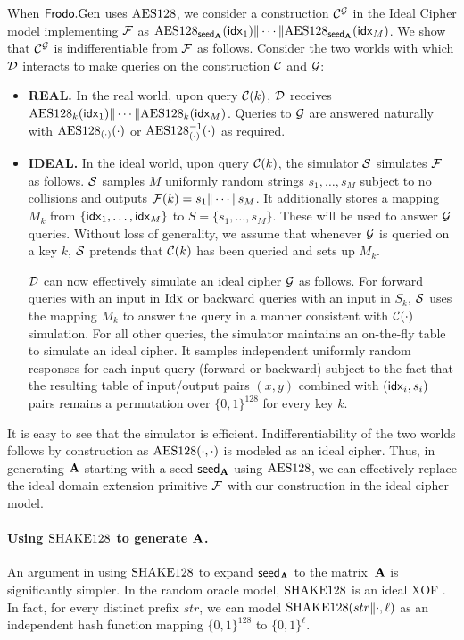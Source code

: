 \documentclass{iacrcc}
\begin{document}
When $\textsf{\upshape\mdseries Frodo}.\textrm{\upshape\mdseries Gen}$ uses $\textrm{\upshape\mdseries AES128}$, we consider a construction
$\mathcal{C}^{\mathcal{G}}$
in the Ideal Cipher model implementing $\mathcal{F}$ as $\textrm{\upshape\mdseries AES128}_{{\mathsf{seed}_{\mathbf{A}}}}(\mathsf{idx}_1) \| \cdots \| \textrm{\upshape\mdseries AES128}_{{\mathsf{seed}_{\mathbf{A}}}}(\mathsf{idx}_M)$. We show that
$\mathcal{C}^{\mathcal{G}}$ is indifferentiable from $\mathcal{F}$ as follows. Consider the two
worlds with which $\mathcal{D}$ interacts to make queries on the construction
$\mathcal{C}$ and $\mathcal{G}$:
\begin{itemize}
	\item \textbf{REAL.} In the real world, upon query $\mathcal{C}(k)$, $\mathcal{D}$
	receives $\textrm{\upshape\mdseries AES128}_k(\mathsf{idx}_1) \| \cdots \| \textrm{\upshape\mdseries AES128}_k(\mathsf{idx}_M)$. 
      Queries to $\mathcal{G}$ are answered naturally with
	$\textrm{\upshape\mdseries AES128}_{(\cdot)}(\cdot)$ or $\textrm{\upshape\mdseries AES128}^{-1}_{(\cdot)}(\cdot)$ as
	required.
	\item \textbf{IDEAL.} In the ideal world, upon query $\mathcal{C}(k)$, the
	simulator $\mathcal{S}$ simulates $\mathcal{F}$ as follows. $\mathcal{S}$ samples $M$
	uniformly random strings $s_1, \ldots, s_M$ subject to no collisions and outputs
	$\mathcal{F}(k) = s_1 \| \cdots \| s_M$. It additionally stores a mapping $M_k$
	from $\{\mathsf{idx}_1, \ldots, \mathsf{idx}_M\}$ to $S = \{s_1, \ldots, s_M\}$. These
	will be used to answer $\mathcal{G}$ queries. Without loss of generality, we
	assume that whenever $\mathcal{G}$ is queried on a key $k$, $\mathcal{S}$ pretends
	that $\mathcal{C}(k)$ has been queried and sets up $M_k$.
	
	$\mathcal{D}$ can now effectively simulate an ideal cipher $\mathcal{G}$ as follows.
	For forward queries with an input in $\mathrm{Idx}$ or backward queries with
	an input in $S_k$, $\mathcal{S}$ uses the mapping $M_k$ to answer the query in a
	manner consistent with $\mathcal{C}(\cdot)$ simulation. For all other queries, the simulator maintains an
	on-the-fly table to simulate an ideal cipher. It samples independent
	uniformly random responses for each input query (forward or backward) subject to
	the fact that the resulting table of input/output pairs $(x, y)$ combined
	with $(\mathsf{idx}_i, s_i)$ pairs remains a permutation
	over $\{0, 1\}^{128}$ for every key $k$.
\end{itemize}

It is easy to see that the simulator is efficient. Indifferentiability of the
two worlds follows by construction as $\textrm{\upshape\mdseries AES128}(\cdot, \cdot)$ is
modeled as an ideal cipher. Thus, in generating $\mathbf{A}$ starting with a seed
${\mathsf{seed}_{\mathbf{A}}}$ using $\textrm{\upshape\mdseries AES128}$, we can effectively replace the ideal
domain extension primitive $\mathcal{F}$ with our construction in the ideal cipher
model.

\paragraph{Using $\textrm{\upshape\mdseries SHAKE}128$ to generate $\mathbf{A}$.} An argument in using
$\textrm{\upshape\mdseries SHAKE}128$ to expand ${\mathsf{seed}_{\mathbf{A}}}$ to the matrix~$\mathbf{A}$ is significantly
simpler. In the random oracle model, $\textrm{\upshape\mdseries SHAKE}128$ is an ideal XOF
\cite{dworkin2015sha}. In fact, for every distinct prefix $str$, we can
model $\textrm{\upshape\mdseries SHAKE}128(str \| \cdot, \ell)$ as an independent hash function mapping
$\{0, 1\}^{128}$ to $\{0, 1\}^\ell$. 
\end{document}
